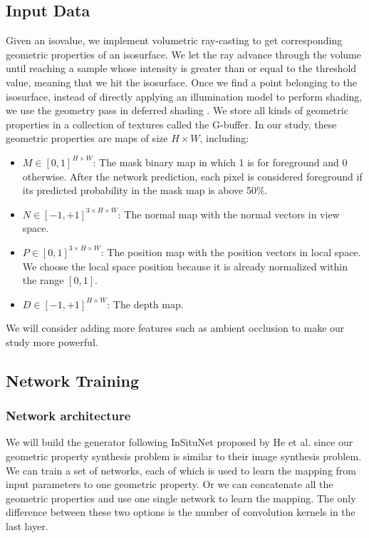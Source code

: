 \documentclass[journal]{vgtc}                %
\begin{document}
\subsection{Input Data}
Given an isovalue, we implement volumetric ray-casting to get corresponding geometric properties of an isosurface. We let the ray advance through the volume until reaching a sample whose intensity is greater than or equal to the threshold value, meaning that we hit the isosurface. Once we find a point belonging to the isosurface, instead of directly applying an illumination model to perform shading, we use the geometry pass in deferred shading \cite{deering1988triangle}. We store all kinds of geometric properties in a collection of textures called the G-buffer. In our study, these geometric properties are maps of size $ H \times W $,  including:

\begin{itemize}
\item $M \in [0, 1] ^ {H \times W}$: The mask binary map in which 1 is for foreground and 0 otherwise. After the network prediction, each pixel is considered foreground if its predicted probability in the mask map is above 50\%.  

\item $N \in [-1, +1] ^ {3 \times H \times W}$: The normal map with the normal vectors in view space.

\item $P \in [0, 1] ^ {3 \times H \times W}$: The position map with the position vectors in local space. We choose the local space position because it is already normalized within the range $[0, 1]$.

\item $D \in [-1, +1] ^ {H \times W}$: The depth map. 

\end{itemize}

We will consider adding more features such as ambient occlusion to make our study more powerful.  

\subsection{Network Training}

\subsubsection{Network architecture}
We will build the generator following InSituNet proposed by He et al. \cite{he2019insitunet} since our geometric property synthesis problem is similar to their image synthesis problem. We can train a set of networks, each of which is used to learn the mapping from input parameters to one geometric property. Or we can concatenate all the geometric properties and use one single network to learn the mapping. The only difference between these two options is the number of convolution kernels in the last layer. 
\end{document}
